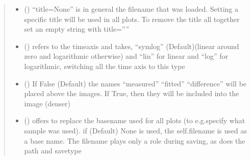 \documentclass[letterpaper,10pt,english]{sphinxmanual}
\begin{document}
\begin{fulllineitems}
\begin{fulllineitems}
\begin{quote}
\begin{description}
\begin{itemize}
\item {} 
 (\sphinxstyleliteralemphasis{\sphinxupquote{, }}) \textendash{} “title=None” is in general the filename that was loaded. Setting a
specific title will be used in all plots. To remove the title all
together set an empty string with title=””

\item {} 
 (\sphinxstyleliteralemphasis{\sphinxupquote{, }}) \textendash{} refers to the time\sphinxhyphen{}axis and takes, “symlog” (Default)(linear around zero and logarithmic otherwise)
and “lin” for linear and  “log” for logarithmic, switching all the time axis to this type

\item {} 
 (\sphinxstyleliteralemphasis{\sphinxupquote{, }}) \textendash{} If False (Default) the names “measured” “fitted” “difference” will be placed above the images.
If True, then they will be included into the image (denser)

\item {} 
 (\sphinxstyleliteralemphasis{\sphinxupquote{, }}) \textendash{} offers to replace the base\sphinxhyphen{}name used for all plots (to e.g.specify what sample was used).
if (Default) None is used, the self.filename is used as a base name. The filename plays only a
role during saving, as does the path and savetype


\end{itemize}
\end{description}
\end{quote}
\end{fulllineitems}
\end{fulllineitems}
\end{document}
